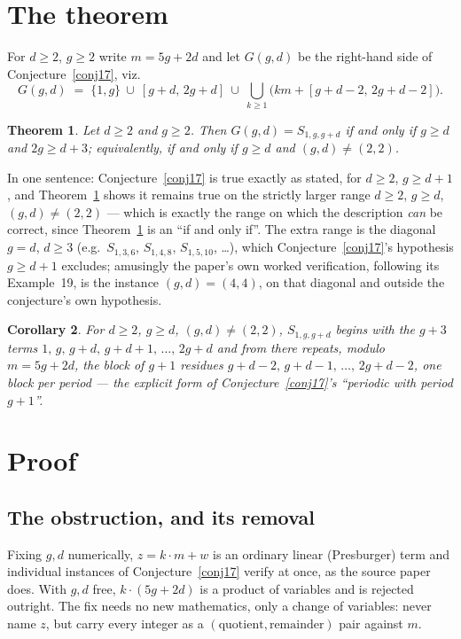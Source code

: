 \documentclass[10pt,reqno]{amsart}
\theoremstyle{plain}
\newtheorem{theorem}{Theorem}
\newtheorem{corollary}[theorem]{Corollary}
\theoremstyle{definition}
\theoremstyle{remark}
\numberwithin{theorem}{section}
\newcommand{\G}{G}
\begin{document}
\section{The theorem}
\label{sec:thm}

For $d\ge 2$, $g\ge 2$ write $m=5g+2d$ and let $\G(g,d)$ be the right-hand side of
Conjecture~\ref{conj17}, viz.
\[
\G(g,d) \;=\; \{1,g\}\ \cup\ [g+d,\,2g+d]\ \cup\ \bigcup_{k\ge1}\bigl(km+[g+d-2,\,2g+d-2]\bigr).
\]

\begin{theorem}
\label{thm:main}
Let $d\ge 2$ and $g\ge 2$. Then $\G(g,d)=S_{1,g,g+d}$ if and only if $g\ge d$ and
$2g\ge d+3$; equivalently, if and only if $g \ge d$ and $(g,d)\ne(2,2)$.
\end{theorem}

In one sentence: Conjecture~\ref{conj17} is true exactly as stated, for $d\ge2$, $g\ge d+1$,
and Theorem~\ref{thm:main} shows it remains true on the strictly larger range $d\ge2$,
$g\ge d$, $(g,d)\ne(2,2)$ --- which is exactly the range on which the description \emph{can}
be correct, since Theorem~\ref{thm:main} is an ``if and only if''. The extra range is the
diagonal $g=d$, $d\ge3$ (e.g.\ $S_{1,3,6}$, $S_{1,4,8}$, $S_{1,5,10}$, \dots), which
Conjecture~\ref{conj17}'s hypothesis $g\ge d+1$ excludes; amusingly the paper's own worked
verification, following its Example~19, is the instance $(g,d)=(4,4)$, on that diagonal and
outside the conjecture's own hypothesis.

\begin{corollary}
\label{cor:period}
For $d\ge2$, $g\ge d$, $(g,d)\ne(2,2)$, $S_{1,g,g+d}$ begins with the $g+3$ terms
$1,\,g,\,g+d,\,g+d+1,\,\dots,\,2g+d$ and from there repeats, modulo $m=5g+2d$, the block of
$g+1$ residues $g+d-2,\,g+d-1,\,\dots,\,2g+d-2$, one block per period --- the explicit form of
Conjecture~\ref{conj17}'s ``periodic with period $g+1$''.
\end{corollary}

\section{Proof}
\label{sec:proof}

\subsection*{The obstruction, and its removal}
Fixing $g,d$ numerically, $z=k\cdot m+w$ is an ordinary linear (Presburger) term and
individual instances of Conjecture~\ref{conj17} verify at once, as the source paper does. With
$g,d$ free, $k\cdot(5g+2d)$ is a product of variables and is rejected outright. The fix needs
no new mathematics, only a change of variables: never name $z$, but carry every integer as a
$(\text{quotient},\text{remainder})$ pair against $m$.
\end{document}
